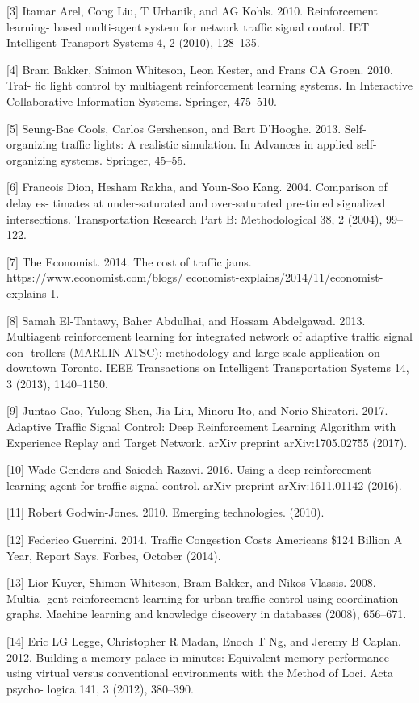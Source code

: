 \documentclass{article}
\begin{document}
[3] Itamar Arel, Cong Liu, T Urbanik, and AG Kohls. 2010. Reinforcement learning-
based multi-agent system for network traffic signal control. IET Intelligent
Transport Systems 4, 2 (2010), 128–135.

[4] Bram Bakker, Shimon Whiteson, Leon Kester, and Frans CA Groen. 2010. Traf-
fic light control by multiagent reinforcement learning systems. In Interactive
Collaborative Information Systems. Springer, 475–510.

[5] Seung-Bae Cools, Carlos Gershenson, and Bart D’Hooghe. 2013. Self-organizing
traffic lights: A realistic simulation. In Advances in applied self-organizing systems.
Springer, 45–55.

[6] Francois Dion, Hesham Rakha, and Youn-Soo Kang. 2004. Comparison of delay es-
timates at under-saturated and over-saturated pre-timed signalized intersections.
Transportation Research Part B: Methodological 38, 2 (2004), 99–122.

[7] The Economist. 2014. The cost of traffic jams. https://www.economist.com/blogs/
economist-explains/2014/11/economist-explains-1.

[8] Samah El-Tantawy, Baher Abdulhai, and Hossam Abdelgawad. 2013. Multiagent
reinforcement learning for integrated network of adaptive traffic signal con-
trollers (MARLIN-ATSC): methodology and large-scale application on downtown
Toronto. IEEE Transactions on Intelligent Transportation Systems 14, 3 (2013),
1140–1150.

[9] Juntao Gao, Yulong Shen, Jia Liu, Minoru Ito, and Norio Shiratori. 2017. Adaptive
Traffic Signal Control: Deep Reinforcement Learning Algorithm with Experience
Replay and Target Network. arXiv preprint arXiv:1705.02755 (2017).

[10] Wade Genders and Saiedeh Razavi. 2016. Using a deep reinforcement learning
agent for traffic signal control. arXiv preprint arXiv:1611.01142 (2016).

[11] Robert Godwin-Jones. 2010. Emerging technologies. (2010).

[12] Federico Guerrini. 2014. Traffic Congestion Costs Americans \$124 Billion A Year,
Report Says. Forbes, October (2014).

[13] Lior Kuyer, Shimon Whiteson, Bram Bakker, and Nikos Vlassis. 2008. Multia-
gent reinforcement learning for urban traffic control using coordination graphs.
Machine learning and knowledge discovery in databases (2008), 656–671.

[14] Eric LG Legge, Christopher R Madan, Enoch T Ng, and Jeremy B Caplan. 2012.
Building a memory palace in minutes: Equivalent memory performance using
virtual versus conventional environments with the Method of Loci. Acta psycho-
logica 141, 3 (2012), 380–390.
\end{document}

